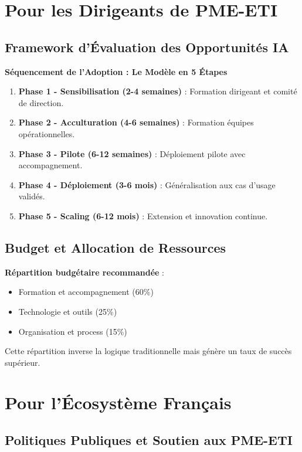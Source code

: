 \section{Pour les Dirigeants de PME-ETI}

\subsection{Framework d'Évaluation des Opportunités IA}

\textbf{Séquencement de l'Adoption : Le Modèle en 5 Étapes}
\begin{enumerate}
    \item \textbf{Phase 1 - Sensibilisation (2-4 semaines)} : Formation dirigeant et comité de direction.
    \item \textbf{Phase 2 - Acculturation (4-6 semaines)} : Formation équipes opérationnelles.
    \item \textbf{Phase 3 - Pilote (6-12 semaines)} : Déploiement pilote avec accompagnement.
    \item \textbf{Phase 4 - Déploiement (3-6 mois)} : Généralisation aux cas d'usage validés.
    \item \textbf{Phase 5 - Scaling (6-12 mois)} : Extension et innovation continue.
\end{enumerate}

\subsection{Budget et Allocation de Ressources}

\textbf{Répartition budgétaire recommandée} :
\begin{itemize}
    \item Formation et accompagnement (60\%)
    \item Technologie et outils (25\%)
    \item Organisation et process (15\%)
\end{itemize}
Cette répartition inverse la logique traditionnelle mais génère un taux de succès supérieur.

\section{Pour l'Écosystème Français}

\subsection{Politiques Publiques et Soutien aux PME-ETI}

